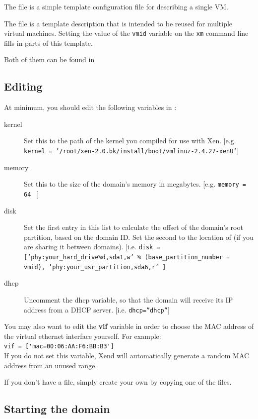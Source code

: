 \documentclass[11pt,twoside,final,openright]{xenstyle}
\begin{document}
The  file is a simple template configuration file
for describing a single VM.

The  file is a template description that is intended
to be reused for multiple virtual machines.  Setting the value of the
{\tt vmid} variable on the {\tt xm} command line
fills in parts of this template.

Both of them can be found in 
\subsection{Editing }

At minimum, you should edit the following variables in :

\begin{description}
\item[kernel] Set this to the path of the kernel you compiled for use
              with Xen. [e.g. {\tt kernel =
              '/root/xen-2.0.bk/install/boot/vmlinuz-2.4.27-xenU'}]
\item[memory] Set this to the size of the domain's memory in
megabytes. [e.g. {\tt memory = 64 } ]
\item[disk] Set the first entry in this list to calculate the offset
of the domain's root partition, based on the domain ID.  Set the
second to the location of  (if you are sharing it between
domains). [i.e. {\tt disk = ['phy:your\_hard\_drive\%d,sda1,w' \%
(base\_partition\_number + vmid), 'phy:your\_usr\_partition,sda6,r' ]}
\item[dhcp] Uncomment the dhcp variable, so that the domain will
receive its IP address from a DHCP server. [i.e. {\tt dhcp=''dhcp''}]
\end{description}

You may also want to edit the {\bf vif} variable in order to choose
the MAC address of the virtual ethernet interface yourself.  For
example: \\ \verb_vif = ['mac=00:06:AA:F6:BB:B3']_\\ If you do not set
this variable, Xend will automatically generate a random MAC address
from an unused range.

If you don't have a  file, simply create your own 
by copying one of the  files.
\subsection{Starting the domain}
\end{document}
